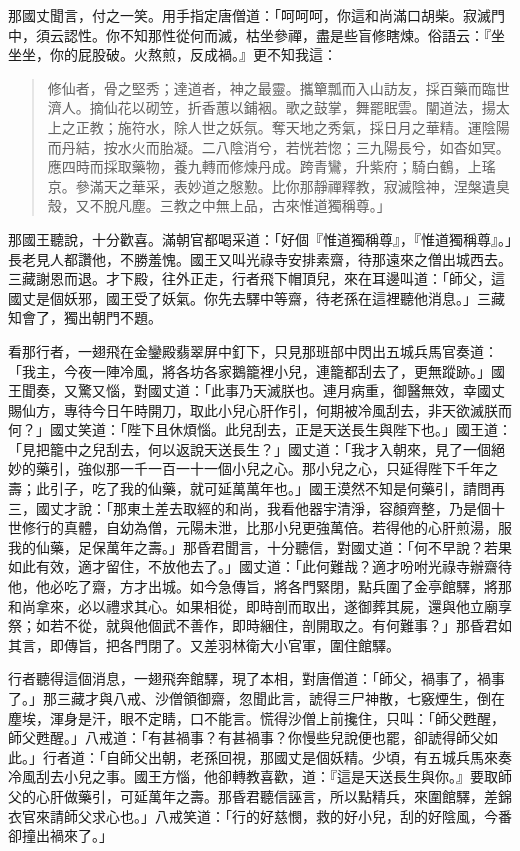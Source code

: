 那國丈聞言，付之一笑。用手指定唐僧道：「呵呵呵，你這和尚滿口胡柴。寂滅門中，須云認性。你不知那性從何而滅，枯坐參禪，盡是些盲修瞎煉。俗語云：『坐坐坐，你的屁股破。火熬煎，反成禍。』更不知我這：
\begin{quote}
修仙者，骨之堅秀；達道者，神之最靈。攜簞瓢而入山訪友，採百藥而臨世濟人。摘仙花以砌笠，折香蕙以鋪裀。歌之鼓掌，舞罷眠雲。闡道法，揚太上之正教；施符水，除人世之妖氛。奪天地之秀氣，採日月之華精。運陰陽而丹結，按水火而胎凝。二八陰消兮，若恍若惚；三九陽長兮，如杳如冥。應四時而採取藥物，養九轉而修煉丹成。跨青鸞，升紫府；騎白鶴，上瑤京。參滿天之華采，表妙道之慇懃。比你那靜禪釋教，寂滅陰神，涅槃遺臭殼，又不脫凡塵。三教之中無上品，古來惟道獨稱尊。」
\end{quote}

那國王聽說，十分歡喜。滿朝官都喝采道：「好個『惟道獨稱尊』，『惟道獨稱尊』。」長老見人都讚他，不勝羞愧。國王又叫光祿寺安排素齋，待那遠來之僧出城西去。三藏謝恩而退。才下殿，往外正走，行者飛下帽頂兒，來在耳邊叫道：「師父，這國丈是個妖邪，國王受了妖氣。你先去驛中等齋，待老孫在這裡聽他消息。」三藏知會了，獨出朝門不題。

看那行者，一翅飛在金鑾殿翡翠屏中釘下，只見那班部中閃出五城兵馬官奏道：「我主，今夜一陣冷風，將各坊各家鵝籠裡小兒，連籠都刮去了，更無蹤跡。」國王聞奏，又驚又惱，對國丈道：「此事乃天滅朕也。連月病重，御醫無效，幸國丈賜仙方，專待今日午時開刀，取此小兒心肝作引，何期被冷風刮去，非天欲滅朕而何？」國丈笑道：「陛下且休煩惱。此兒刮去，正是天送長生與陛下也。」國王道：「見把籠中之兒刮去，何以返說天送長生？」國丈道：「我才入朝來，見了一個絕妙的藥引，強似那一千一百一十一個小兒之心。那小兒之心，只延得陛下千年之壽；此引子，吃了我的仙藥，就可延萬萬年也。」國王漠然不知是何藥引，請問再三，國丈才說：「那東土差去取經的和尚，我看他器宇清淨，容顏齊整，乃是個十世修行的真體，自幼為僧，元陽未泄，比那小兒更強萬倍。若得他的心肝煎湯，服我的仙藥，足保萬年之壽。」那昏君聞言，十分聽信，對國丈道：「何不早說？若果如此有效，適才留住，不放他去了。」國丈道：「此何難哉？適才吩咐光祿寺辦齋待他，他必吃了齋，方才出城。如今急傳旨，將各門緊閉，點兵圍了金亭館驛，將那和尚拿來，必以禮求其心。如果相從，即時剖而取出，遂御葬其屍，還與他立廟享祭；如若不從，就與他個武不善作，即時綑住，剖開取之。有何難事？」那昏君如其言，即傳旨，把各門閉了。又差羽林衛大小官軍，圍住館驛。

行者聽得這個消息，一翅飛奔館驛，現了本相，對唐僧道：「師父，禍事了，禍事了。」那三藏才與八戒、沙僧領御齋，忽聞此言，諕得三尸神散，七竅煙生，倒在塵埃，渾身是汗，眼不定睛，口不能言。慌得沙僧上前攙住，只叫：「師父甦醒，師父甦醒。」八戒道：「有甚禍事？有甚禍事？你慢些兒說便也罷，卻諕得師父如此。」行者道：「自師父出朝，老孫回視，那國丈是個妖精。少頃，有五城兵馬來奏冷風刮去小兒之事。國王方惱，他卻轉教喜歡，道：『這是天送長生與你。』要取師父的心肝做藥引，可延萬年之壽。那昏君聽信誣言，所以點精兵，來圍館驛，差錦衣官來請師父求心也。」八戒笑道：「行的好慈憫，救的好小兒，刮的好陰風，今番卻撞出禍來了。」


